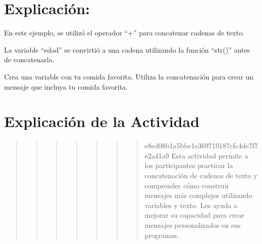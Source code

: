 \documentclass[
  a4paper,
  onepage,
  openany]{scrreprt}
\begin{document}
\hypertarget{explicaciuxf3n-15}{%
\section{Explicación:}\label{explicaciuxf3n-15}}

En este ejemplo, se utilizó el operador ``+'' para concatenar cadenas de
texto.

La variable ``edad'' se convirtió a una cadena utilizando la función
``str()'' antes de concatenarla.

\begin{tcolorbox}[enhanced jigsaw, breakable, opacityback=0, toptitle=1mm, coltitle=black, toprule=.15mm, rightrule=.15mm, colframe=quarto-callout-important-color-frame, opacitybacktitle=0.6, arc=.35mm, title=\textcolor{quarto-callout-important-color}{\faExclamation}\hspace{0.5em}{Actividad Práctica:}, titlerule=0mm, colbacktitle=quarto-callout-important-color!10!white, bottomtitle=1mm, bottomrule=.15mm, colback=white, left=2mm, leftrule=.75mm]

Crea una variable con tu comida favorita. Utiliza la concatenación para
crear un mensaje que incluya tu comida favorita.

\end{tcolorbox}

\hypertarget{explicaciuxf3n-de-la-actividad-13}{%
\section{Explicación de la
Actividad}\label{explicaciuxf3n-de-la-actividad-13}}

\begin{quote}
\begin{quote}
\begin{quote}
\begin{quote}
\begin{quote}
\begin{quote}
\begin{quote}
e8ed08b1a5bbe1e369719187cfc4de7f7e2a41a9 Esta actividad permite a los
participantes practicar la concatenación de cadenas de texto y
comprender cómo construir mensajes más complejos utilizando variables y
texto. Les ayuda a mejorar su capacidad para crear mensajes
personalizados en sus programas.
\end{quote}
\end{quote}
\end{quote}
\end{quote}
\end{quote}
\end{quote}
\end{quote}
\end{document}
